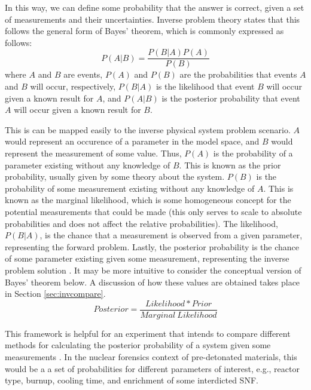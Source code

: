 In this way, we can define some probability that the answer is correct, given a
set of measurements and their uncertainties. Inverse problem theory states that
this follows the general form of Bayes' theorem, which is commonly expressed as
follows:
\begin{equation}
  \label{eq:bayes}
  P(A|B) = \frac{P(B|A)P(A)}{P(B)}
\end{equation}
where $A$ and $B$ are events, $P(A)$ and $P(B)$ are the probabilities that events
$A$ and $B$ will occur, respectively, $P(B|A)$ is the likelihood that event 
$B$ will occur given a known result for $A$, and $P(A|B)$ is the posterior 
probability that event $A$ will occur given a known result for $B$.

This is can be mapped easily to the inverse physical system problem scenario.
$A$ would represent an occurence of a parameter in the model space, and $B$
would represent the measurement of some value. Thus, $P(A)$ is the probability
of a parameter existing without any knowledge of $B$. This is known as the prior
probability, usually given by some theory about the system. $P(B)$ is the
probability of some measurement existing without any knowledge of $A$. This is
known as the marginal likelihood, which is some homogeneous concept for the
potential measurements that could be made (this only serves to scale to absolute
probabilities and does not affect the relative probabilities). The likelihood,
$P(B|A)$, is the chance that a measurement is observed from a given parameter,
representing the forward problem.  Lastly, the posterior probability is the
chance of some parameter existing given some measurement, representing the
inverse problem solution \cite{inverse_theory, gentle_bayes}.  It may be more
intuitive to consider the conceptual version of Bayes' theorem below.  A
discussion of how these values are obtained takes place in Section
\ref{sec:invcompare}.
\begin{equation}
  \label{eq:bayes_words}
  Posterior = \frac{Likelihood * Prior}{Marginal \ Likelihood} 
\end{equation} 

This framework is helpful for an experiment that intends to compare different
methods for calculating the posterior probability of a system given some
measurements \cite{bayes_compare}.  In the nuclear forensics context of
pre-detonated materials, this would be a a set of probabilities for different
parameters of interest, e.g., reactor type, burnup, cooling time, and
enrichment of some interdicted \gls{SNF}. 

